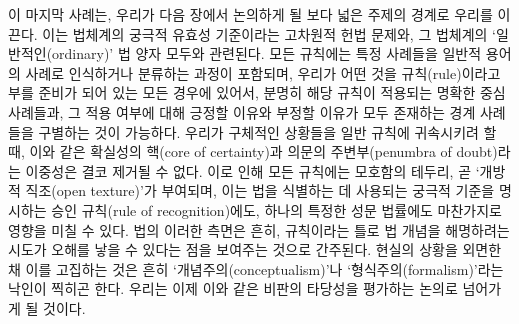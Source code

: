 이 마지막 사례는, 우리가 다음 장에서 논의하게 될 보다 넓은 주제의 경계로
우리를 이끈다. 이는 법체계의 궁극적 유효성 기준이라는 고차원적 헌법
문제와, 그 법체계의 `일반적인(ordinary)' 법 양자 모두와 관련된다. 모든
규칙에는 특정 사례들을 일반적 용어의 사례로 인식하거나 분류하는 과정이
포함되며, 우리가 어떤 것을 규칙(rule)이라고 부를 준비가 되어 있는 모든
경우에 있어서, 분명히 해당 규칙이 적용되는 명확한 중심 사례들과, 그 적용
여부에 대해 긍정할 이유와 부정할 이유가 모두 존재하는 경계 사례들을
구별하는 것이 가능하다. 우리가 구체적인 상황들을 일반 규칙에 귀속시키려
할 때, 이와 같은 확실성의 핵(core of certainty)과 의문의 주변부(penumbra
of doubt)라는 이중성은 결코 제거될 수 없다. 이로 인해 모든 규칙에는
모호함의 테두리, 곧 `개방적 직조(open texture)'가 부여되며, 이는 법을
식별하는 데 사용되는 궁극적 기준을 명시하는 승인 규칙(rule of
recognition)에도, 하나의 특정한 성문 법률에도 마찬가지로 영향을 미칠 수
있다. 법의 이러한 측면은 흔히, 규칙이라는 틀로 법 개념을 해명하려는
시도가 오해를 낳을 수 있다는 점을 보여주는 것으로 간주된다. 현실의
상황을 외면한 채 이를 고집하는 것은 흔히 `개념주의(conceptualism)'나
`형식주의(formalism)'라는 낙인이 찍히곤 한다. 우리는 이제 이와 같은
비판의 타당성을 평가하는 논의로 넘어가게 될 것이다.

\newpage

